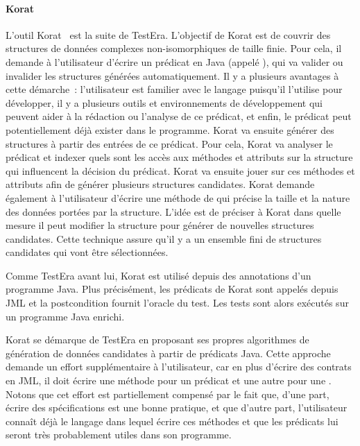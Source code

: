 \paragraph{Korat} L'outil Korat~ est la suite de Test\-Era.
L'objectif de Korat est de couvrir des structures de données complexes
non-isomorphiques de taille finie. Pour cela, il demande à l'utilisateur
d'écrire un prédicat en Java (appelé ), qui va valider ou invalider
les structures générées automatiquement. Il y a plusieurs avantages à cette
démarche~: l'utilisateur est familier avec le langage puisqu'il l'utilise pour
développer, il y a plusieurs outils et environnements de développement qui
peuvent aider à la rédaction ou l'analyse de ce prédicat, et enfin, le prédicat
peut potentiellement déjà exister dans le programme. Korat va ensuite générer
des structures à partir des entrées de ce prédicat. Pour cela, Korat va analyser
le prédicat et indexer quels sont les accès aux méthodes et attributs sur la
structure qui influencent la décision du prédicat. Korat va ensuite jouer sur
ces méthodes et attributs afin de générer plusieurs structures candidates. Korat
demande également à l'utilisateur d'écrire une méthode de
 qui précise la taille et la nature des données portées
par la structure. L'idée est de préciser à Korat dans quelle mesure il peut
modifier la structure pour générer de nouvelles structures candidates. Cette
technique assure qu'il y a un ensemble fini de structures candidates qui vont
être sélectionnées.

Comme TestEra avant lui, Korat est utilisé depuis des annotations d'un programme
Java. Plus précisément, les prédicats de Korat sont appelés depuis JML et la
postcondition fournit l'oracle du test. Les tests sont alors exécutés sur un
programme Java enrichi.

Korat se démarque de TestEra en proposant ses propres algorithmes de génération
de données candidates à partir de prédicats Java. Cette approche demande un
effort supplémentaire à l'utilisateur, car en plus d'écrire des contrats en JML,
il doit écrire une méthode pour un prédicat et une autre pour une
. Notons que cet effort est partiellement compensé par
le fait que, d'une part, écrire des spécifications est une bonne pratique, et
que d'autre part, l'utilisateur connaît déjà le langage dans lequel écrire ces
méthodes et que les prédicats lui seront très probablement utiles dans son
programme.

